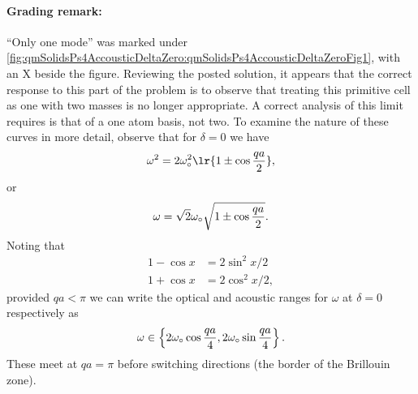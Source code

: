 {\paragraph{Grading remark:} ``Only one mode'' was marked under \cref{fig:qmSolidsPs4AccousticDeltaZero:qmSolidsPs4AccousticDeltaZeroFig1}, with an X beside the figure.  Reviewing the posted solution, it appears that the correct response to this part of the problem is to observe that treating this primitive cell as one with two masses is no longer appropriate.  A correct analysis of this limit requires is that of a one atom basis, not two.
%
To examine the nature of these curves in more detail, observe that for \(\delta = 0\) we have
%
\begin{dmath}\label{eqn:condensedMatterProblemSet4Problem2:820}
\omega^2 = 2 \omega_\nought^2 \lr{ 1 \pm \cos \frac{qa}{2} },
\end{dmath}
%
or
\begin{dmath}\label{eqn:condensedMatterProblemSet4Problem2:840}
\omega = \sqrt{2} \omega_\nought \sqrt{ 1 \pm \cos \frac{qa}{2} }.
\end{dmath}
%
Noting that
\begin{equation}\label{eqn:condensedMatterProblemSet4Problem2:860}
\begin{aligned}
1 - \cos x &= 2 \sin^2 x/2 \\
1 + \cos x &= 2 \cos^2 x/2,
\end{aligned}
\end{equation}
%
provided \(qa < \pi\) we can write the optical and acoustic ranges for \(\omega\) at \(\delta = 0\) respectively as
%
\begin{dmath}\label{eqn:condensedMatterProblemSet4Problem2:880}
\omega \in \left\{
2 \omega_\nought \cos \frac{qa}{4},
2 \omega_\nought \sin \frac{qa}{4}
 \right\}.
\end{dmath}
%
These meet at \(qa = \pi\) before switching directions (the border of the Brillouin zone).
}

